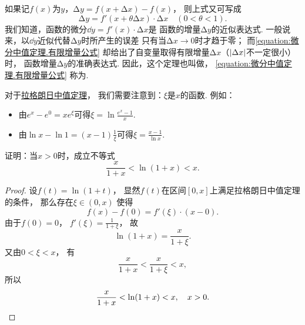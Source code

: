 如果记\(f(x)\)为\(y\)，\(\increment y = f(x+\increment x) - f(x)\)，
则上式又可写成
\begin{equation}\label{equation:微分中值定理.有限增量公式}
	\increment y = f'(x+\theta \increment x) \cdot \increment x
	\quad(0<\theta<1).
\end{equation}
我们知道，函数的微分\(\dd{y} = f'(x) \cdot \increment x\)是
函数的增量\(\increment y\)的近似表达式.
一般说来，以\(\dd{y}\)近似代替\(\increment y\)时所产生的误差
只有当\(\increment x\to0\)时才趋于零；
而\cref{equation:微分中值定理.有限增量公式}
却给出了自变量取得有限增量\(\increment x\)（\(\abs{\Delta x}\)不一定很小）时，
函数增量\(\increment y\)的准确表达式.
因此，这个定理也叫做，
\cref{equation:微分中值定理.有限增量公式} 称为.

\begin{remark}
对于\hyperref[theorem:微分中值定理.拉格朗日中值定理]{拉格朗日中值定理}，
我们需要注意到：\(\xi\)是\(x\)的函数.
例如：\begin{itemize}
	\item 由\(e^x - e^0 = x e^\xi\)可得\(\xi = \ln\frac{e^x-1}{x}\).
	\item 由\(\ln x - \ln1 = (x-1) \frac1\xi\)可得\(\xi = \frac{x-1}{\ln x}\).
\end{itemize}
\end{remark}

\begin{example}\label{example:微分中值定理.拉格朗日中值定理.重要不等式1}
证明：当\(x>0\)时，成立不等式\[
	\frac{x}{1+x} < \ln(1+x) < x.
\]
\begin{proof}
设\(f(t) = \ln(1+t)\)，
显然\(f(t)\)在区间\([0,x]\)上满足拉格朗日中值定理的条件，
那么存在\(\xi\in(0,x)\)
使得\[
	f(x)-f(0)=f'(\xi)\cdot(x-0).
\]
由于\(f(0)=0\)，
\(f'(\xi)=\frac{1}{1+\xi}\)，
故\[
	\ln(1+x) = \frac{x}{1+\xi}.
\]
又由\(0<\xi<x\)，
有\[
	\frac{x}{1+x}<\frac{x}{1+\xi}<x,
\]
所以\[
	\frac{x}{1+x}<\ln(1+x)<x, \quad x > 0.
	\qedhere
\]
\end{proof}
\end{example}

